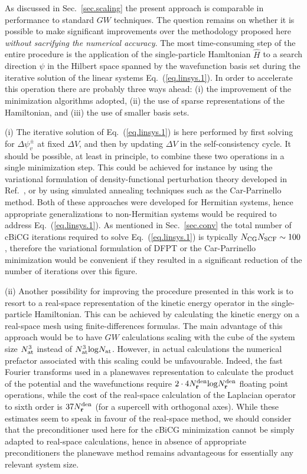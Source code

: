 \documentclass[twocolumn,prb,showpacs,superscriptaddress]{revtex4}
\def\H{\hat{H}}
\def\r{{\bf r}}
\begin{document}
As discussed in Sec.\ \ref{sec.scaling} the present approach is comparable
in performance to standard\cite{hl86} $GW$ techniques.
The question remains on whether it is possible to make significant
improvements over the methodology proposed here {\it without sacrifying
the numerical accuracy}. The most time-consuming
step of the entire procedure is the application of the single-particle
Hamltonian $\H$ to a search direction $\psi$ in the Hilbert space spanned
by the wavefunction basis set during the iterative solution 
of the linear systems Eq.\ (\ref{eq.linsys.1}). In order to accelerate
this operation there are probably three ways ahead: (i) the improvement of the
minimization algorithms adopted, (ii) the use of sparse representations of
the Hamiltonian, and (iii) the use of smaller basis sets. 

(i) The iterative solution of Eq.\ (\ref{eq.linsys.1}) is here performed
by first solving for $\Delta\psi_v^\pm$ at fixed $\Delta V$, and then 
by updating $\Delta V$ in the self-consistency cycle.
It should be possible, at least in principle, to combine these two
operations in a single minimization step. This could be achieved
for instance by using the variational formulation of density-functional
perturbation theory developed in Ref.\ ,
or by using simulated annealing techniques such as the Car-Parrinello 
method.\cite{carparrinello} Both of these approaches were developed
for Hermitian systems, hence appropriate generalizations
to non-Hermitian systems would be required to address Eq.\ (\ref{eq.linsys.1}).
As mentioned in Sec.\ \ref{sec.conv} the total number of cBiCG iterations
required to solve Eq.\ (\ref{eq.linsys.1}) is typically 
$N_{\rm CG} N_{\rm SCF}\sim 100$, therefore the variational formulation
of DFPT or the Car-Parrinello minimization would be convenient
if they resulted in a significant reduction of the number of iterations
over this figure.

(ii) Another possibility for improving the procedure presented in this work
is to resort to a real-space representation of the kinetic energy operator
in the single-particle Hamiltonian. This can be achieved by
calculating the kinetic energy on a real-space mesh using finite-differences
formulas.\cite{chelikowsky} The main advantage of this approach would be
to have $GW$ calculations scaling with the cube of the system size
$N_{\rm at}^3$ instead of $N_{\rm at}^3 {\rm log} N_{\rm at}$.
However, in actual calculations the numerical prefactor associated with this scaling
could be unfavourable. Indeed, the fast Fourier transforms used in a planewaves
representation to calculate the product of the potential and the wavefunctions
require $2\cdot 4 N_\r^{\rm den} {\rm log} N_\r^{\rm den}$ floating point operations,
while the cost of the real-space calculation of the Laplacian operator
to sixth order is $37 N_\r^{\rm den}$
(for a supercell with orthogonal axes).\cite{chelikowsky} 
While these estimates seem to speak in favour of the real-space method,
we should consider that the preconditioner used here\cite{tpa} for the 
cBiCG minimization cannot be simply adapted to real-space calculations,
hence in absence of appropriate preconditioners the planewave method
remains advantageous for essentially any relevant system size.
\end{document}
